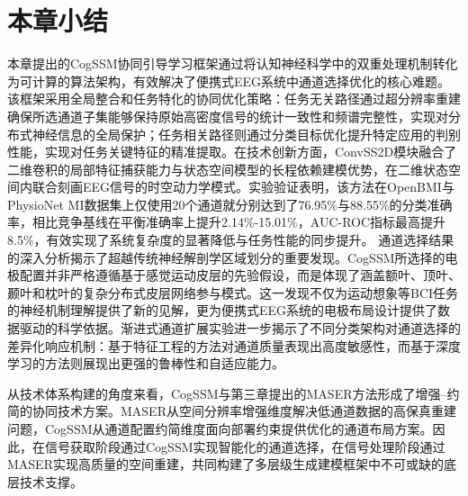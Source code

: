 \section{本章小结}
本章提出的CogSSM协同引导学习框架通过将认知神经科学中的双重处理机制转化为可计算的算法架构，有效解决了便携式EEG系统中通道选择优化的核心难题。该框架采用全局整合和任务特化的协同优化策略：任务无关路径通过超分辨率重建确保所选通道子集能够保持原始高密度信号的统计一致性和频谱完整性，实现对分布式神经信息的全局保护；任务相关路径则通过分类目标优化提升特定应用的判别性能，实现对任务关键特征的精准提取。在技术创新方面，ConvSS2D模块融合了二维卷积的局部特征捕获能力与状态空间模型的长程依赖建模优势，在二维状态空间内联合刻画EEG信号的时空动力学模式。实验验证表明，该方法在OpenBMI与PhysioNet MI数据集上仅使用20个通道就分别达到了76.95\%与88.55\%的分类准确率，相比竞争基线在平衡准确率上提升2.14\%-15.01\%，AUC-ROC指标最高提升8.5\%，有效实现了系统复杂度的显著降低与任务性能的同步提升。
通道选择结果的深入分析揭示了超越传统神经解剖学区域划分的重要发现。CogSSM所选择的电极配置并非严格遵循基于感觉运动皮层的先验假设，而是体现了涵盖额叶、顶叶、颞叶和枕叶的复杂分布式皮层网络参与模式。这一发现不仅为运动想象等BCI任务的神经机制理解提供了新的见解，更为便携式EEG系统的电极布局设计提供了数据驱动的科学依据。渐进式通道扩展实验进一步揭示了不同分类架构对通道选择的差异化响应机制：基于特征工程的方法对通道质量表现出高度敏感性，而基于深度学习的方法则展现出更强的鲁棒性和自适应能力。

从技术体系构建的角度来看，CogSSM与第三章提出的MASER方法形成了增强--约简的协同技术方案。MASER从空间分辨率增强维度解决低通道数据的高保真重建问题，CogSSM从通道配置约简维度面向部署约束提供优化的通道布局方案。因此，在信号获取阶段通过CogSSM实现智能化的通道选择，在信号处理阶段通过MASER实现高质量的空间重建，共同构建了多层级生成建模框架中不可或缺的底层技术支撑。
